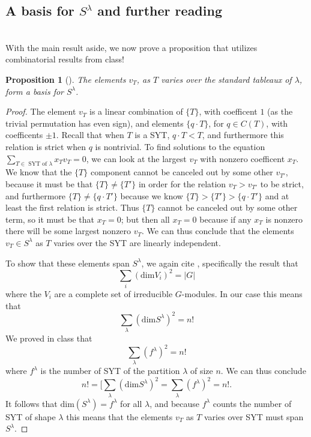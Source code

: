 \documentclass[11 pt]{amsart}
\theoremstyle{plain}   %
\newtheorem{prop}{Proposition}[section]
\theoremstyle{definition}
\theoremstyle{remark}
\numberwithin{equation}{section}
\def\dim{\mathrm{dim}}
\begin{document}
\subsection{A basis for $S^\lambda$ and further reading} \hfill\\
With the main result aside, we now prove a proposition that utilizes combinatorial results from class!
\begin{prop}[{\cite[Pg. 88]{fulton}}]\label{prop1}
  The elements $v_T$, as $T$ varies over the \emph{standard} tableaux of $\lambda$, form a basis for $S^\lambda$.
\end{prop}
\begin{proof}
  The element $v_T$ is a linear combination of $\{T\}$, with coefficent $1$ (as the trivial permutation has even sign),
  and elements $\{q \cdot T\}$, for $q \in C(T)$, with coefficents $\pm 1$.
  Recall that when $T$ is a SYT, $q \cdot T < T$, and furthermore this relation is strict when $q$ is nontrivial.
  To find solutions to the equation $\sum_{T \in \text{ SYT of $\lambda$}} x_Tv_T = 0$,
  we can look at the largest $v_T$ with nonzero coefficent $x_T$.
  We know that the $\{T\}$ component cannot be canceled out by some other $v_{T'}$, because it must be that $\{T\} \neq \{T'\}$ in
  order for the relation $v_T > v_{T'}$ to be strict,
  and furthermore $\{T\} \neq \{q \cdot T'\}$ because we know $\{ T\} > \{T'\} > \{q \cdot T'\}$ and at least the first relation is strict.
  Thus $\{T\}$ cannot be canceled out by some other term, so it must be that $x_T = 0$; but then all $x_T = 0$ because
  if any $x_T$ is nonzero there will be some largest nonzero $v_T$.
  We can thus conclude that the elements $v_T \in S^\lambda$ as $T$ varies over the SYT are linearly independent. \par
  To show that these elements span $S^\lambda$, we again cite \cite[Proposition 1.10.1]{sagan}, specifically the result
  that
  \[ \sum_i (\dim V_i)^2 =|G| \]
  where the $V_i$ are a complete set of irreducible $G$-modules.
  In our case this means that
  \[\sum_\lambda (\dim S^\lambda)^2 = n!\]
  We proved in class that
  \[ \sum_\lambda(f^\lambda)^2 = n!\]
  where $f^\lambda$ is the number of SYT of the partition $\lambda$ of size $n$.
  We can thus conclude
  \[ n! = [\sum_\lambda (\dim S^\lambda)^2 = \sum_\lambda(f^\lambda)^2 = n!.\]
  It follows that $\dim(S^\lambda) = f^\lambda$ for all $\lambda$, and because $f^\lambda$ counts the number of SYT of shape $\lambda$
  this means that the elements $v_T$ as $T$ varies over SYT must span $S^\lambda$.
\end{proof}
\end{document}

